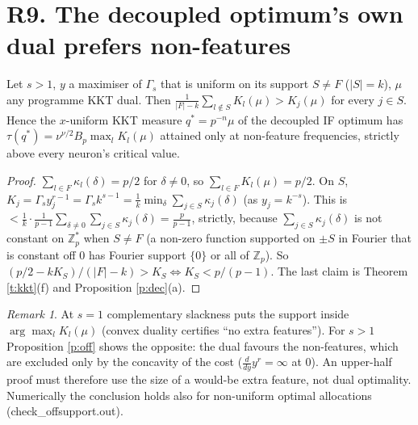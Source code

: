 \documentclass[11pt]{article}
\theoremstyle{remark}\newtheorem{remark}[theorem]{Remark}
\begin{document}
\section{R9. The decoupled optimum's own dual prefers non-features}
\begin{proposition}\label{p:off}
Let $s>1$, $y$ a maximiser of $\Gamma_s$ that is uniform on its support $S\ne F$ ($|S|=k$), $\mu$ any programme KKT dual. Then
$\frac1{|F|-k}\sum_{l\notin S}K_l(\mu)>K_j(\mu)$ for every $j\in S$. Hence the $x$-uniform KKT measure $q^*=p^{-n}\mu$ of the decoupled IF optimum has
$\tau(q^*)=\nu^{\nu/2}B_p\max_lK_l(\mu)$ attained only at non-feature frequencies, strictly above every neuron's critical value.
\end{proposition}
\begin{proof}
$\sum_{l\in F}\kappa_l(\delta)=p/2$ for $\delta\ne0$, so $\sum_{l\in F}K_l(\mu)=p/2$. On $S$, $K_j=\Gamma_sy_j^{r-1}=\Gamma_sk^{s-1}=\frac1k\min_\delta\sum_{j\in S}\kappa_j(\delta)$
(as $y_j=k^{-s}$). This is $<\frac1k\cdot\frac1{p-1}\sum_{\delta\ne0}\sum_{j\in S}\kappa_j(\delta)=\frac p{p-1}$, strictly, because $\sum_{j\in S}\kappa_j(\delta)$ is not constant
on $\mathbb Z_p^*$ when $S\ne F$ (a non-zero function supported on $\pm S$ in Fourier that is constant off $0$ has Fourier support $\{0\}$ or all of $\mathbb Z_p$).
So $(p/2-kK_S)/(|F|-k)>K_S\iff K_S<p/(p-1)$. The last claim is Theorem \ref{t:kkt}(f) and Proposition \ref{p:dec}(a).
\end{proof}
\begin{remark}
At $s=1$ complementary slackness puts the support inside $\arg\max_lK_l(\mu)$ (convex duality certifies ``no extra features''). For $s>1$ Proposition \ref{p:off} shows the
opposite: the dual favours the non-features, which are excluded only by the concavity of the cost ($\frac d{dy}y^r=\infty$ at $0$). An upper-half proof must
therefore use the size of a would-be extra feature, not dual optimality. Numerically the conclusion holds also for non-uniform optimal allocations (check\_offsupport.out).
\end{remark}
\end{document}
